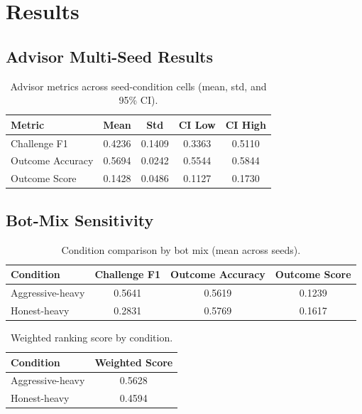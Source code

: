 \documentclass[11pt]{article}
\begin{document}
\section{Results}
\subsection{Advisor Multi-Seed Results}
\label{sec:advisor-multiseed}
\begin{table}[H]
\centering
\caption{Advisor metrics across seed-condition cells (mean, std, and 95\% CI).}
\label{tab:advisor-main}
\begin{tabular}{lcccc}
\toprule
Metric & Mean & Std & CI Low & CI High \\
\midrule
Challenge F1 & 0.4236 & 0.1409 & 0.3363 & 0.5110 \\
Outcome Accuracy & 0.5694 & 0.0242 & 0.5544 & 0.5844 \\
Outcome Score & 0.1428 & 0.0486 & 0.1127 & 0.1730 \\
\bottomrule
\end{tabular}
\end{table}

\subsection{Bot-Mix Sensitivity}
\begin{table}[H]
\centering
\caption{Condition comparison by bot mix (mean across seeds).}
\label{tab:botmix}
\begin{tabular}{lccc}
\toprule
Condition & Challenge F1 & Outcome Accuracy & Outcome Score \\
\midrule
Aggressive-heavy & 0.5641 & 0.5619 & 0.1239 \\
Honest-heavy & 0.2831 & 0.5769 & 0.1617 \\
\bottomrule
\end{tabular}
\end{table}

\begin{table}[H]
\centering
\caption{Weighted ranking score by condition.}
\label{tab:ranking}
\begin{tabular}{lc}
\toprule
Condition & Weighted Score \\
\midrule
Aggressive-heavy & 0.5628 \\
Honest-heavy & 0.4594 \\
\bottomrule
\end{tabular}
\end{table}
\end{document}
